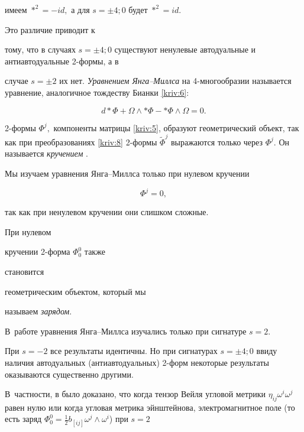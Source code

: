 имеем $\ast ^{2}=-id,$ а для $s=\pm 4;0$ будет $\ast ^{2}=id.$ 

Это различие приводит к 

тому, что в случаях $s=\pm 4;0$ существуют ненулевые автодуальные и антиавтодуальные 2-формы, а в 

случае $s=\pm 2$ их нет. \textit{Уравнением Янга--Миллса} на 4-многообразии называется уравнение,  аналогичное тождеству Бианки \eqref{kriv:6}:

\begin{equation}

d\ast \Phi +\Omega \wedge \ast \Phi -\ast \Phi \wedge \Omega =0.  \label{kriv:10}

\end{equation}



2-формы $\Phi ^{j},$ компоненты матрицы \eqref{kriv:5}, образуют геометрический объект, так как при преобразованиях \eqref{kriv:8} 2-формы $\widetilde{\Phi }^{j}$ выражаются только через $\Phi ^{j}.$ Он называется \textit{кручением} \cite[стр. 169]{bib:kriv:1}. 

Мы изучаем уравнения Янга--Миллса только  при нулевом кручении 

\begin{equation}

\Phi ^{j}=0,  \label{kriv:14}

\end{equation}

так как при ненулевом кручении они слишком сложные.



При нулевом 

кручении 2-форма $\Phi _{0}^{0}$ также 

становится 

геометрическим объектом, который мы 

называем \textit{зарядом}. 

В~работе \cite{bib:kriv:2} уравнения Янга--Миллса изучались только при  сигнатуре $s=2.$ 

При $s=-2$ все результаты идентичны. Но при сигнатурах $s=\pm 4;0$ ввиду наличия автодуальных (антиавтодуальных) 2-форм некоторые результаты оказываются существенно другими. 

В~частности, в \cite{bib:kriv:2} было доказано, что когда тензор Вейля угловой метрики $\eta _{ij}\omega ^{i}\omega ^{j}$ равен нулю или когда угловая метрика эйнштейнова, электромагнитное поле (то есть заряд $\Phi _{0}^{0}=\tfrac{1}{2}b_{\left[ ij\right] }\omega ^{j}\wedge \omega ^{i}$) при $s=2$

